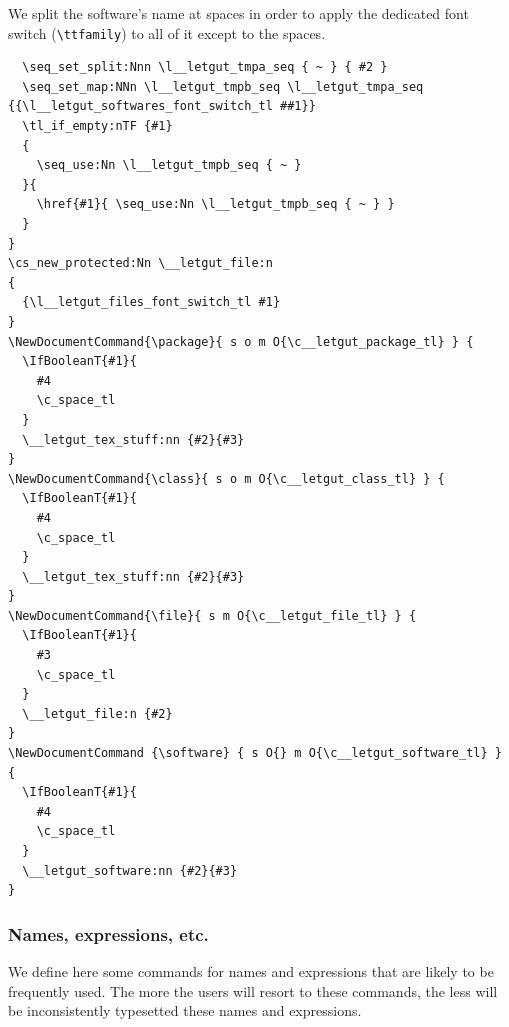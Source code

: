 \documentclass{letgut}
\begin{document}
We split the software's name at spaces in order to apply the dedicated
font switch (\lstinline+\ttfamily+) to all of it except to the spaces.

\begin{lstlisting}
  \seq_set_split:Nnn \l__letgut_tmpa_seq { ~ } { #2 }
  \seq_set_map:NNn \l__letgut_tmpb_seq \l__letgut_tmpa_seq {{\l__letgut_softwares_font_switch_tl ##1}}
  \tl_if_empty:nTF {#1}
  {
    \seq_use:Nn \l__letgut_tmpb_seq { ~ }
  }{
    \href{#1}{ \seq_use:Nn \l__letgut_tmpb_seq { ~ } }
  }
}
\cs_new_protected:Nn \__letgut_file:n
{
  {\l__letgut_files_font_switch_tl #1}
}
\NewDocumentCommand{\package}{ s o m O{\c__letgut_package_tl} } {
  \IfBooleanT{#1}{
    #4
    \c_space_tl
  }
  \__letgut_tex_stuff:nn {#2}{#3}
}
\NewDocumentCommand{\class}{ s o m O{\c__letgut_class_tl} } {
  \IfBooleanT{#1}{
    #4
    \c_space_tl
  }
  \__letgut_tex_stuff:nn {#2}{#3}
}
\NewDocumentCommand{\file}{ s m O{\c__letgut_file_tl} } {
  \IfBooleanT{#1}{
    #3
    \c_space_tl
  }
  \__letgut_file:n {#2}
}
\NewDocumentCommand {\software} { s O{} m O{\c__letgut_software_tl} } {
  \IfBooleanT{#1}{
    #4
    \c_space_tl
  }
  \__letgut_software:nn {#2}{#3}
}
\end{lstlisting}
\subsubsection{Names, expressions, etc.}
\label{ImplementationDocumentcommandsNamesexpressionsetc-11vg55h0jlj0}
We define here some commands for names and expressions that are likely to be
frequently used. The more the users will resort to these commands, the less
will be inconsistently typesetted these names and expressions.
\end{document}
